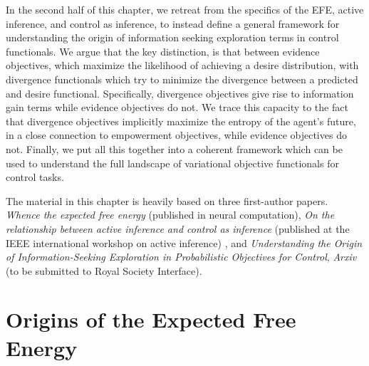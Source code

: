 In the second half of this chapter, we retreat from the specifics of the EFE, active inference, and control as inference, to instead define a general framework for understanding the origin of information seeking exploration terms in control functionals. We argue that the key distinction, is that between evidence objectives, which maximize the likelihood of achieving a desire distribution, with divergence functionals which try to minimize the divergence between a predicted and desire functional. Specifically, divergence objectives give rise to information gain terms while evidence objectives do not. We trace this capacity to the fact that divergence objectives implicitly maximize the entropy of the agent's future, in a close connection to empowerment objectives, while evidence objectives do not. Finally, we put all this together into a coherent framework which can be used to understand the full landscape of variational objective functionals for control tasks.

The material in this chapter is heavily based on three first-author papers. \emph{Whence the expected free energy} \citep{millidge2020whence} (published in neural computation), \emph{On the relationship between active inference and control as inference} (published at the IEEE international workshop on active inference) \citep{millidge2020relationship}, and \citep{millidge2021understanding} \emph{Understanding the Origin of Information-Seeking Exploration in Probabilistic Objectives for Control}, \emph{Arxiv} (to be submitted to Royal Society Interface).

\section{Origins of the Expected Free Energy}

